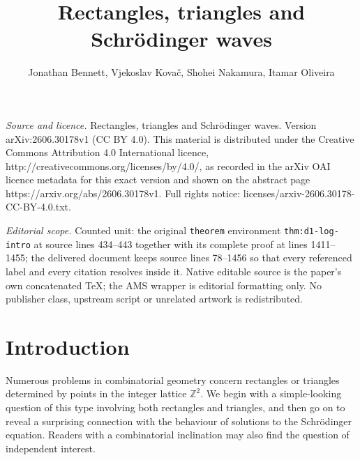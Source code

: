 \documentclass[10pt,a4paper]{amsart}
\numberwithin{equation}{section}
\begin{document}
\title[Rectangles, triangles and Schr"odinger waves]{Rectangles, triangles and Schr\"{o}dinger waves}
\author{Jonathan Bennett, Vjekoslav Kovač, Shohei Nakamura, Itamar Oliveira}
\date{}
\maketitle
\noindent\emph{Source and licence.} Rectangles, triangles and Schr\"{o}dinger waves. Version arXiv:2606.30178v1 (CC BY 4.0). This material is distributed under the Creative Commons Attribution 4.0 International licence, http://creativecommons.org/licenses/by/4.0/, as recorded in the arXiv OAI licence metadata for this exact version and shown on the abstract page https://arxiv.org/abs/2606.30178v1. Full rights notice: licenses/arxiv-2606.30178-CC-BY-4.0.txt.\par\smallskip
\noindent\textit{Editorial scope.} Counted unit: the original \texttt{theorem} environment \texttt{thm:d1-log-intro} at source lines 434--443 together with its complete proof at lines 1411--1455; the delivered document keeps source lines 78--1456 so that every referenced label and every citation resolves inside it. Native editable source is the paper's own concatenated TeX; the AMS wrapper is editorial formatting only. No publisher class, upstream script or unrelated artwork is redistributed.
\section{Introduction}

Numerous problems in combinatorial geometry concern rectangles or triangles determined by points in the integer lattice $\mathbb{Z}^2$. We begin with a simple-looking question of this type involving both rectangles and triangles, and then go on to reveal a surprising connection with the behaviour of solutions to the Schr\"{o}dinger equation. Readers with a combinatorial inclination may also find the question of independent interest.
\end{document}
